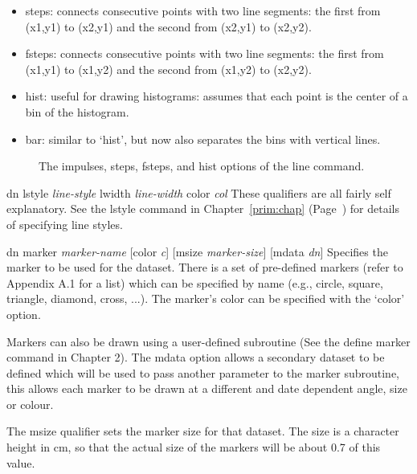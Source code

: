 \begin{commanddescription}
\begin{itemize}
\item {\sf steps}: connects consecutive points with two line segments: the first from (x1,y1) to (x2,y1) and the second from (x2,y1) to (x2,y2).

\item {\sf fsteps}: connects consecutive points with two line segments: the first from (x1,y1) to (x1,y2) and the second from (x1,y2) to (x2,y2).

\item {\sf hist}: useful for drawing histograms: assumes that each point is the center of a bin of the histogram.

\item {\sf bar}: similar to `{\sf hist}', but now also separates the bins with vertical lines.
\end{itemize}

\begin{figure}[tb]
\centering

\caption{\label{linemode:fig}The {\sf impulses}, {\sf steps}, {\sf fsteps}, and {\sf hist} options of the line command.}
\end{figure}

\item[{\sf dn lstyle {\it line-style} lwidth {\it line-width} color {\it col}}  ]
These qualifiers are all fairly self explanatory.  See the {\sf lstyle} command
in Chapter~\ref{prim:chap} (Page~\pageref{lstyle:cmd}) for details of specifying line styles.

\item[{\sf dn marker {\it marker-name} [color {\it c}] [msize {\it marker-size}] [mdata {\it dn}]}]
Specifies the marker to be used for the dataset.  There is a set of pre-defined markers (refer to Appendix A.1 for a list)  which can be specified by name (e.g., {\sf circle, square, triangle, diamond, cross, ...}). The marker's color can be specified with the `{\sf color}' option.

Markers can also be drawn using a user-defined subroutine (See the {\sf define marker} command in Chapter 2).  The {\sf mdata} option allows a secondary dataset to be defined which will be used to pass another parameter to the marker subroutine, this allows each marker to be drawn at a different and date dependent angle, size or colour.

The {\sf msize} qualifier sets the marker size for that dataset. The size is a character height in cm, so that the actual size of the markers will be about 0.7 of this value.


\end{commanddescription}

